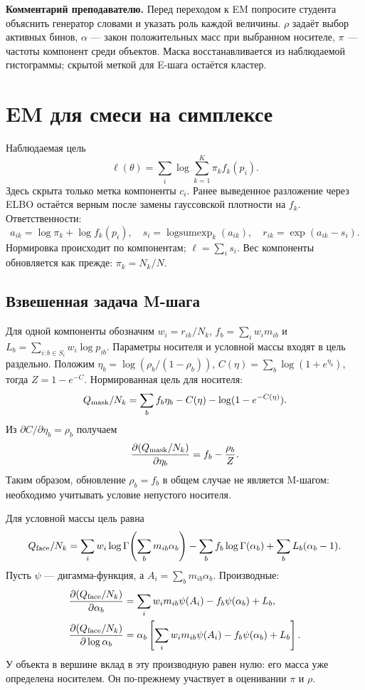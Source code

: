 \documentclass[11pt,a4paper]{article}
\newcommand{\LSE}{\operatorname{logsumexp}}
\newcommand{\teach}[1]{\par\textbf{Комментарий преподавателю.} #1\par}
\begin{document}
\teach{Перед переходом к EM попросите студента объяснить генератор словами
и указать роль каждой величины. $\rho$ задаёт выбор активных бинов,
$\alpha$ --- закон положительных масс при выбранном носителе,
$\pi$ --- частоты компонент среди объектов. Маска восстанавливается
из наблюдаемой гистограммы; скрытой меткой для E-шага остаётся кластер.}


\section{EM для смеси на симплексе}

Наблюдаемая цель
\[
 \ell(\theta)=\sum_i\log\sum_{k=1}^K\pi_kf_k(p_i).
\]
Здесь скрыта только метка компоненты $c_i$.
Ранее выведенное разложение через ELBO остаётся верным после замены
гауссовской плотности на $f_k$. Ответственности:
\[
 a_{ik}=\log\pi_k+\log f_k(p_i),\quad
 s_i=\LSE_k(a_{ik}),\quad r_{ik}=\exp(a_{ik}-s_i).
\]
Нормировка происходит по компонентам; $\ell=\sum_i s_i$.
Вес компоненты обновляется как прежде: $\pi_k=N_k/N$.

\subsection{Взвешенная задача M-шага}
Для одной компоненты обозначим $w_i=r_{ik}/N_k$,
$f_b=\sum_iw_im_{ib}$ и
$L_b=\sum_{i:b\in S_i}w_i\log p_{ib}$.
Параметры носителя и условной массы входят в цель раздельно.
Положим $\eta_b=\log(\rho_b/(1-\rho_b))$,
$C(\eta)=\sum_b\log(1+e^{\eta_b})$, тогда
$Z=1-e^{-C}$. Нормированная цель для носителя:
\[
 Q_{\rm mask}/N_k=\sum_b f_b\eta_b-C(\eta)-\log(1-e^{-C(\eta)}).
\]
Из $\partial C/\partial\eta_b=\rho_b$ получаем
\[
 \frac{\partial(Q_{\rm mask}/N_k)}{\partial\eta_b}
 =f_b-\frac{\rho_b}{Z}.
\]
Таким образом, обновление $\rho_b=f_b$ в общем случае не является
M-шагом: необходимо учитывать условие непустого носителя.

Для условной массы цель равна
\[
 Q_{\rm face}/N_k=
 \sum_iw_i\log\Gamma\!\left(\sum_bm_{ib}\alpha_b\right)
 -\sum_b f_b\log\Gamma(\alpha_b)
 +\sum_b L_b(\alpha_b-1).
\]
Пусть $\psi$ --- дигамма-функция, а $A_i=\sum_bm_{ib}\alpha_b$.
Производные:
\begin{align*}
 \frac{\partial(Q_{\rm face}/N_k)}{\partial\alpha_b}
 &=\sum_iw_im_{ib}\psi(A_i)-f_b\psi(\alpha_b)+L_b,\\
 \frac{\partial(Q_{\rm face}/N_k)}{\partial\log\alpha_b}
 &=\alpha_b\left[\sum_iw_im_{ib}\psi(A_i)
                         -f_b\psi(\alpha_b)+L_b\right].
\end{align*}
У объекта в вершине вклад в эту производную равен нулю: его масса уже
определена носителем. Он по-прежнему участвует в оценивании $\pi$ и $\rho$.
\end{document}

